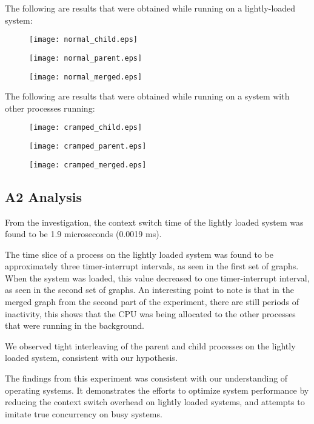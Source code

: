 \documentclass[a4paper, 12pt]{article}
\begin{document}
The following are results that were obtained while running on a lightly-loaded system:
\begin{figure}[H]
	\centering
		\texttt{[image: normal\_child.eps]}
\end{figure}
\begin{figure}[H]
	\centering
		\texttt{[image: normal\_parent.eps]}
\end{figure}
\begin{figure}[H]
	\centering
		\texttt{[image: normal\_merged.eps]}
\end{figure}

The following are results that were obtained while running on a system with other processes running:
\begin{figure}[H]
	\centering
		\texttt{[image: cramped\_child.eps]}
\end{figure}
\begin{figure}[H]
	\centering
		\texttt{[image: cramped\_parent.eps]}
\end{figure}
\begin{figure}[H]
	\centering
		\texttt{[image: cramped\_merged.eps]}
\end{figure}

\subsection{A2 Analysis}
From the investigation, the context switch time of the lightly loaded system was found to be 1.9 microseconds (0.0019 ms).

The time slice of a process on the lightly loaded system was found to be approximately three timer-interrupt intervals, as seen in the first set of graphs. When the system was loaded, this value decreased to one timer-interrupt interval, as seen in the second set of graphs. An interesting point to note is that in the merged graph from the second part of the experiment, there are still periods of inactivity, this shows that the CPU was being allocated to the other processes that were running in the background.

We observed tight interleaving of the parent and child processes on the lightly loaded system, consistent with our hypothesis.

The findings from this experiment was consistent with our understanding of operating systems. It demonstrates the efforts to optimize system performance by reducing the context switch overhead on lightly loaded systems, and attempts to imitate true concurrency on busy systems.
\end{document}
